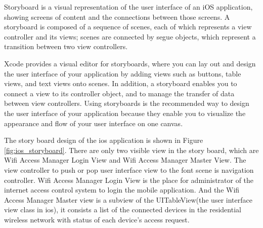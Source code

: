 \par Storyboard\cite{xcode_storyboard} is a visual representation of the user interface of an iOS application, showing screens of content and the connections between those screens. A storyboard is composed of a sequence of scenes, each of which represents a view controller and its views; scenes are connected by segue objects, which represent a transition between two view controllers.

\par Xcode provides a visual editor for storyboards, where you can lay out and design the user interface of your application by adding views such as buttons, table views, and text views onto scenes. In addition, a storyboard enables you to connect a view to its controller object, and to manage the transfer of data between view controllers. Using storyboards is the recommended way to design the user interface of your application because they enable you to visualize the appearance and flow of your user interface on one canvas.

\par The story board design of the \gls{ios} application is shown in Figure \ref{fig:ios_storyboard}. There are only two visible view in the story board, which are Wifi Access Manager Login View and Wifi Access Manager Master View. The view controller to push or pop user interface view to the font scene is navigation controller. Wifi Access Manager Login View is the place for administrator of the internet access control system to login the mobile application. And the Wifi Access Manager Master view is a subview of the UITableView(the user interface view class in \gls{ios}), it consists a list of the connected devices in the residential wireless network with status of each device's access request.

